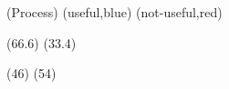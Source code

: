 \documentclass[crop,tikz]{standalone}
\begin{document}
\begin{tracedraw}


  \tracedrawEnableLineName(\LARGE{Process})
  \tracedrawAddToLegend(useful,blue)
  \tracedrawAddToLegend(not-useful,red)

  \tracedrawAddChunk[color=gray, fill=blue](66.6)
  \tracedrawAddChunk[color=gray, fill=red](33.4)

  \tracedrawNewLine

  \tracedrawAddChunk[color=gray, fill=blue](46)
  \tracedrawAddChunk[color=gray, fill=red](54)

\end{tracedraw}
\end{document}
